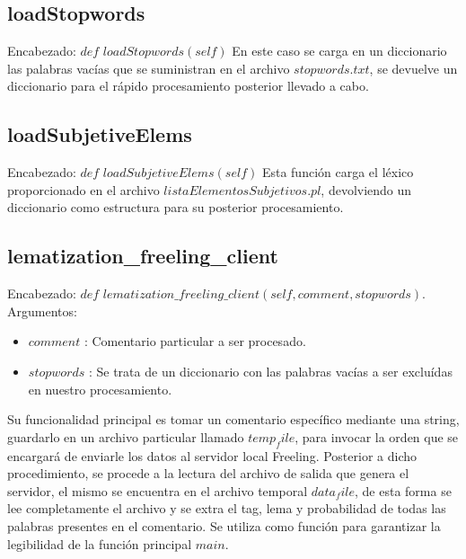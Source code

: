 \documentclass[12pt]{article}
\begin{document}
\subsection{loadStopwords}
Encabezado: $def$ $loadStopwords(self)$
En este caso se carga en un diccionario las palabras vacías que se suministran en el archivo $stopwords.txt$, se devuelve un diccionario para el rápido procesamiento posterior llevado a cabo.


\subsection{loadSubjetiveElems}
Encabezado: $def$ $loadSubjetiveElems(self)$
Esta función carga el léxico proporcionado en el archivo $listaElementosSubjetivos.pl$, devolviendo un diccionario como estructura para su posterior procesamiento.


\subsection{lematization\_freeling\_client}
Encabezado: $def$ $lematization\_freeling\_client(self, comment, stopwords)$.
Argumentos:
\begin{itemize}
  \item $comment$ : Comentario particular a ser procesado.
  \item $stopwords$ : Se trata de un diccionario con las palabras vacías a ser excluídas en nuestro procesamiento.
\end{itemize}
Su funcionalidad principal es tomar un comentario específico mediante una string, guardarlo en un archivo particular llamado $temp_file$, para invocar la orden que se encargará de enviarle los datos al servidor local Freeling. Posterior a dicho procedimiento, se procede a la lectura del archivo de salida que genera el servidor, el mismo se encuentra en el archivo temporal $data_file$, de esta forma se lee completamente el archivo y se extra el tag, lema y probabilidad de todas las palabras presentes en el comentario.
Se utiliza como función para garantizar la legibilidad de la función principal $main$.
\end{document}
